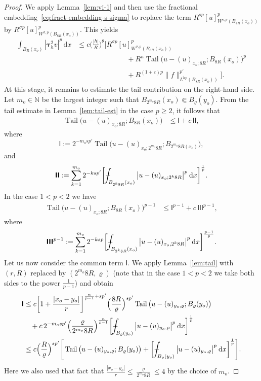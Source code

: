 \documentclass[10pt,letterpaper]{amsart}
\theoremstyle{definition}
\numberwithin{theorem}{section}
\numberwithin{equation}{section}
\newcommand{\1}{\ensuremath{\mathds{1}}}
\newcommand{\dx}{\mathrm{d}x}
\newcommand\sfI{{\boldsymbol{\mathsf I}}}
\def\Xint#1{\mathchoice
    {\XXint\displaystyle\textstyle{#1}}%
    {\XXint\textstyle\scriptstyle{#1}}%
    {\XXint\scriptstyle\scriptscriptstyle{#1}}%
    {\XXint\scriptscriptstyle\scriptscriptstyle{#1}}%
    \!\int}
\def\XXint#1#2#3{\setbox0=\hbox{$#1{#2#3}{\int}$}
    \vcenter{\hbox{$#2#3$}}\kern-0.5\wd0}
\def\bint{\Xint-}
\renewcommand{\epsilon}{\varepsilon}
\renewcommand{\rho}{\varrho}
\renewcommand{\epsilon}{\varepsilon}
\renewcommand{\rho}{\varrho}
\renewcommand{\d}{\:\! \mathrm{d}}
\DeclareMathOperator{\Tail}{Tail}
\numberwithin{equation}{section}
\begin{document}
\begin{proof}
We apply Lemma~\ref{lem:vi-1} and then use the fractional embedding~\eqref{eq:fract-embedding-s-sigma}
to replace the term $R^{s p} [u]_{W^{s,p}(B_{4R}(x_o))}^p$ by
$R^{\sigma p} [u]_{W^{\sigma,p}(B_{8R}(x_o))}^p$.
This yields
\begin{align*}
    \int_{B_{R}(x_o)} |\boldsymbol{\tau}_h^2 v|^p \, \dx 
    &\leq
    c \Big(\frac{|h|}{R}\Big)^{\theta} 
    \Big[ R^{\sigma p} [u]_{W^{\sigma,p}(B_{8R}(x_o))}^p \\
    &\qquad\qquad\qquad\quad + 
    R^n \Tail \big(u - (u)_{x_o;8R}; B_{8R}(x_o)\big)^p \\
    &\qquad\qquad\qquad\quad + 
    R^{(1+\epsilon)p} \|f\|_{L^{\tilde\alpha p}(B_{8R}(x_o))}^{p'} \Big].
\end{align*}
At this stage, it remains to estimate the tail contribution on the right-hand side. 
Let $m_o\in\mathbb{N}$ be the largest integer such that 
$B_{2^{m_o}8R}(x_o)\Subset B_\rho(y_o)$. 
From the tail estimate in Lemma~\ref{lem:tail-est} in the case $p\ge2$, it follows that
\begin{align} \label{eq:tail-rhoi-estimate}
    \Tail \big(u-(u)_{x_o;8R}; B_{8R}(x_o)\big) 
    &\leq 
    \sfI+ c\,\sfI\sfI,
\end{align}
where 
$$
    \sfI
    :=
    2^{-m_o sp'} \Tail \big(u-(u)_{x_o;2^{m_o} 8R};B_{2^{m_o} 8R(x_o)}\big),
$$
and
$$
    \sfI\sfI
    :=
    \sum_{k=1}^{m_o} 2^{-ksp'} 
    \bigg[ \bint_{B_{2^k 8R}(x_o)} \big|u-(u)_{x_o;2^k 8R}\big|^p \, \d x \bigg]^\frac{1}{p}.
$$
In the case $1<p<2$ we have 
\begin{align}\label{eq:tail-rhoi-estimate-}
    \Tail \big(u-(u)_{x_o;8R}; B_{8R}(x_o)\big)^{p-1} 
    &\leq 
    \sfI^{p-1} + c\,\sfI\sfI\sfI^{p-1},
\end{align}
where 
\begin{align*}
    \sfI\sfI\sfI^{p-1}
    :=
    \sum_{k=1}^{m_o} 2^{-ksp} \bigg[ \bint_{B_{2^k8R}(x_o)} \big|u-(u)_{x_o,2^k8R}\big|^{p} \, \d x \bigg]^\frac{p-1}{p} .
\end{align*}
Let us now consider the common term $\sfI$. 
We apply Lemma~\ref{lem:tail} with $(r,R)$ replaced by $(2^{m_o}8R,\rho)$ (note that in the case $1<p<2$ we take both sides to the power $\frac{1}{p-1}$) and obtain
\begin{align*}
    \sfI
    &\le 
    c\bigg[1 + \frac{|x_o-y_o|}{r}\bigg]^{\frac{n}{p-1}+sp'} 
    \Big(\frac{8R}{\rho}\Big)^{sp'} \Tail \big(u-(u)_{y_o,\rho}; B_\rho(y_o)\big) \\
    &\phantom{\le\,} + 
    c\, 2^{-m_o sp'}
    \Big(\frac{\rho}{2^{m_o}8R}\Big)^{\frac{n}{p-1}}
    \bigg[ \bint_{B_{\rho}(y_o)} \big|u-(u)_{y_o,\rho}\big|^{p} \, \d x \bigg]^\frac{1}{p} \\
    &\le 
    c \Big(\frac{R}{\rho}\Big)^{sp'} \Bigg[
    \Tail \big(u-(u)_{y_o,\rho}; B_\rho(y_o)\big) +
    \bigg[ \bint_{B_{\rho}(y_o)} \big|u-(u)_{y_o,\rho}\big|^{p} \, \d x \bigg]^\frac{1}{p} \Bigg].
\end{align*}
Here we also used that fact that $\frac{|x_o-y_o|}{r}\le \frac{\rho}{2^{m_o}8R}\le 4$ by the choice of $m_o$. 


\end{proof}
\end{document}
